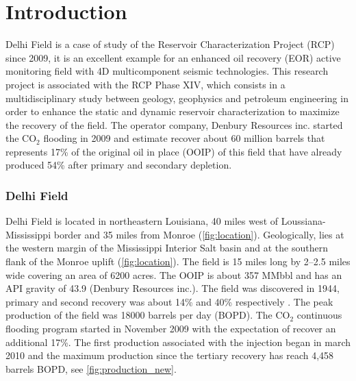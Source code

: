 \chapter{Introduction}
Delhi Field is a case of study of the Reservoir Characterization Project (RCP)
since 2009, it is an excellent example for an enhanced oil recovery (EOR) 
active monitoring field with 4D multicomponent seismic technologies. This research
project is associated with the RCP Phase XIV, which consists in a multidisciplinary study 
between geology, geophysics and petroleum engineering in order to enhance the 
static and dynamic reservoir characterization to maximize the recovery of the field. 
The operator company, Denbury Resources inc. started the CO$_2$ flooding in 2009 and estimate
recover about 60 million barrels that represents 17\% of the original oil in place
(OOIP) of this field that have already produced 54\% after primary and secondary depletion.


\subsection{Delhi Field}

Delhi Field is located in northeastern Louisiana, 40 miles west of 
Loussiana-Mississippi border \citep{ref:nick} and 35 miles from Monroe (\ref{fig:location}).
Geologically, lies at the western margin of the Mississippi Interior Salt basin
\citep{ref:alam} and at the southern flank of the Monroe uplift \citep{ref:bloomer} 
(\ref{fig:location}). The field is 15 miles long by 2--2.5 miles wide covering an
area of 6200 acres. The OOIP is about 357 MMbbl \citep{ref:powell} and has an API
 gravity of 43.9 (Denbury Resources inc.). 
The field was discovered in 1944, primary and second recovery was about 14\% and 40\%
respectively \citep{ref:bloomer}. The peak production of the field was 18000 barrels per day (BOPD). 
The CO$_2$ continuous flooding program started in November 2009 with the expectation
 of recover an additional 17\%. The first production associated with the injection began
 in march 2010 and the maximum production since the tertiary 
recovery has reach 4,458 barrels BOPD, see \ref{fig:production_new}. 


